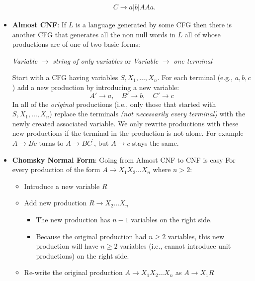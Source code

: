 \documentclass{report}
\begin{document}
\begin{itemize}
\begin{align*}
                &C \to a | b | AAa
            .\end{align*}
        \item \textbf{Almost CNF}: If $L$ is a language generated by some CFG then there is another CFG that generates all the non null words in $L$ all of whose productions are of one of two basic forms:
            \begin{center}
                \textit{Variable} $\to$ \textit{string of only variables} or \textit{Variable} $\to$ \textit{one terminal}
            \end{center}
            Start with a CFG having variables \(S, X_1, \dots, X_n\).
            \bigbreak \noindent 
            For each terminal (e.g., \(a, b, c\)) add a new production by introducing a new variable:
            \[
                A' \rightarrow a, \quad B' \rightarrow b, \quad C' \rightarrow c
            \]
            In all of the \textit{original} productions (i.e., only those that started with \(S, X_1, \dots, X_n\)) replace the terminals \textit{(not necessarily every terminal)} with the newly created associated variable.
            \bigbreak \noindent 
            We only rewrite productions with these new productions if the terminal in the production is not alone. For example $A \to Bc $ turns to $A \to BC^{\prime}$, but $A \to c$ stays the same.
        \item \textbf{Chomsky Normal Form}: Going from Almost CNF to CNF is easy
            \bigbreak \noindent 
            For every production of the form \(A \rightarrow X_1 X_2 \dots X_n\) where \(n > 2\):
            \begin{itemize}
                \item Introduce a new variable \(R\)
                \item Add new production \(R \rightarrow X_2 \dots X_n\)
                    \begin{itemize}
                        \item The new production has \(n-1\) variables on the right side.
                        \item Because the original production had \(n \geq 2\) variables, this new production will have \(n \geq 2\) variables (i.e., cannot introduce unit productions) on the right side.
                    \end{itemize}
                \item Re-write the original production \(A \rightarrow X_1 X_2 \dots X_n\) as \(A \rightarrow X_1 R\)
            \end{itemize}

\end{itemize}
\end{document}
